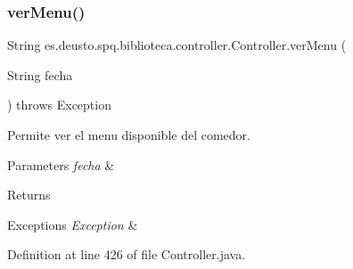 \subsubsection{\texorpdfstring{ver\+Menu()}{verMenu()}}
{\footnotesize\ttfamily String es.\+deusto.\+spq.\+biblioteca.\+controller.\+Controller.\+ver\+Menu (\begin{DoxyParamCaption}\item[{String}]{fecha }\end{DoxyParamCaption}) throws Exception}

Permite ver el menu disponible del comedor. 
\begin{DoxyParams}{Parameters}
{\em fecha} & \\
\hline
\end{DoxyParams}
\begin{DoxyReturn}{Returns}

\end{DoxyReturn}

\begin{DoxyExceptions}{Exceptions}
{\em Exception} & \\
\hline
\end{DoxyExceptions}


Definition at line 426 of file Controller.\+java.


